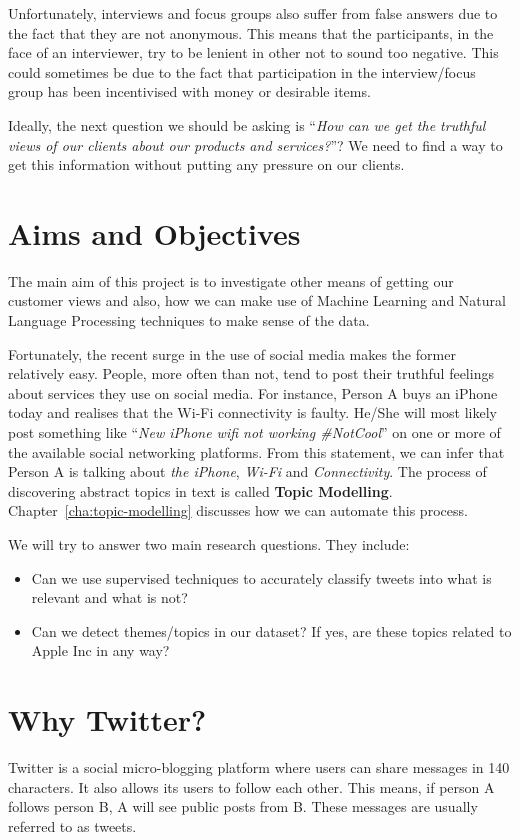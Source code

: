 Unfortunately, interviews and focus groups also suffer from false answers due to the fact that they
are not anonymous. This means that the participants, in the face of an interviewer, try to be
lenient in other not to sound too negative. This could sometimes be due to the fact that
participation in the interview/focus group has been incentivised with money or desirable items.

Ideally, the next question we should be asking is ``\textit{How can we get the truthful views of our
clients about our products and services?}''? We need to find a way to get this information without
putting any pressure on our clients.

\section{Aims and Objectives}
\label{sec:objectives}
The main aim of this project is to investigate other means of getting our customer views and also,
how we can make use of Machine Learning and Natural Language Processing techniques to make sense of
the data.

Fortunately, the recent surge in the use of social media makes the former relatively easy. People,
more often than not, tend to post their truthful feelings about services they use on social media.
For instance, Person A buys an iPhone today and realises that the Wi-Fi connectivity is faulty.
He/She will most likely post something like ``\textit{New iPhone wifi not working \#NotCool}'' on
one or more of the available social networking platforms. From this statement, we can infer that
Person A is talking about \textit{the iPhone}, \textit{Wi-Fi} and \textit{Connectivity}. The process
of discovering abstract topics in text is called \textbf{Topic Modelling}.
Chapter~\ref{cha:topic-modelling} discusses how we can automate this process.

We will try to answer two main research questions. They include:
\begin{itemize}
  \item Can we use supervised techniques to accurately classify tweets into what is relevant and
    what is not?
  \item Can we detect themes/topics in our dataset? If yes, are these topics related to Apple Inc in
    any way?
\end{itemize}


\section{Why Twitter?}
\label{sec:why-twitter}
Twitter is a social micro-blogging platform where users can share messages in 140 characters. It
also allows its users to follow each other. This means, if person A follows person B, A will see
public posts from B. These messages are usually referred to as tweets.

